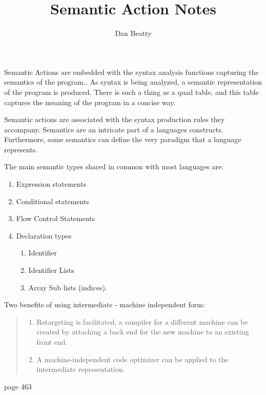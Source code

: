 \documentclass[11pt]{article}
\title{Semantic Action Notes}
\author{Dan Beatty}
\begin{document}
\maketitle


Semantic Actions are embedded with the syntax analysis functions capturing the semantics of the program.. As syntax is being analyzed, a semantic representation of the program is produced.    There is such a thing as a quad table, and this table captures the meaning of the program in a concise way. 



Semantic actions are associated with the syntax production rules they accompany.    Semantics are an intricate part of a languages constructs.    Furthermore, some semantics can define the very paradigm that a language represents.  

The main semantic types shared in common with most languages are:
\begin{enumerate}
\item Expression statements
\item Conditional statements
\item Flow Control Statements
\item Declaration types
\begin{enumerate}
\item Identifier 
\item Identifier Lists
\item Array Sub lists (indices).  
\end{enumerate}
\end{enumerate}



Two benefits of using intermediate - machine independent form:
\begin{quote}
\begin{enumerate}
\item Retargeting is facilitated; a compiler for a different machine can be created by attaching a back end for the new machine to an existing front end. 
\item A machine-independent  code optimizer can be applied to the intermediate representation.  
\end{enumerate}
 \end {quote} \cite{ullmanCompiler} page 463
 
\end{document}
